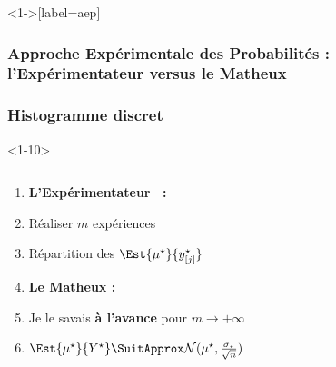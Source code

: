 \documentclass[11pt]{beamer}
\newcommand{\Sim}{{\star}}
\begin{document}
\begin{frame}<1->[label=aep]
\frametitle<1->{\textbf{A}pproche \textbf{E}xpérimentale des \textbf{P}robabilités : l'Expérimentateur versus le Matheux}
\frametitle<11->{Histogramme discret}
\begin{onlyenv}<1-10>
\begin{columns}
\begin{column}{5cm}
      \begin{enumerate}
     \item[] \textbf{L'Expérimentateur ~:} 
        \item<1-10| alert@1-4>
         Réaliser $m$ expériences
        \item<5-10| alert@5-8>
          Répartition des $\Est{\mu^\Sim}{y^\Sim_{[j]}}$
          \hyperlink{aep<11>}{}
  \item<9-10>[] \textbf{Le Matheux :}      
  \item<9-10| alert@9>
          Je le savais \textbf{à l'avance} pour $m\to+\infty$
           \item<10| alert@10>
           $\Est{\mu^\Sim}{Y^\Sim}\SuitApprox \mathcal{N}(\mu^\Sim,\frac{\sigma_\Sim}{\sqrt{n}})$
      \end{enumerate}
     
\end{column}    

\begin{column}{6.5cm}







\end{column}
\end{columns}
\end{onlyenv}
\end{frame}
\end{document}
